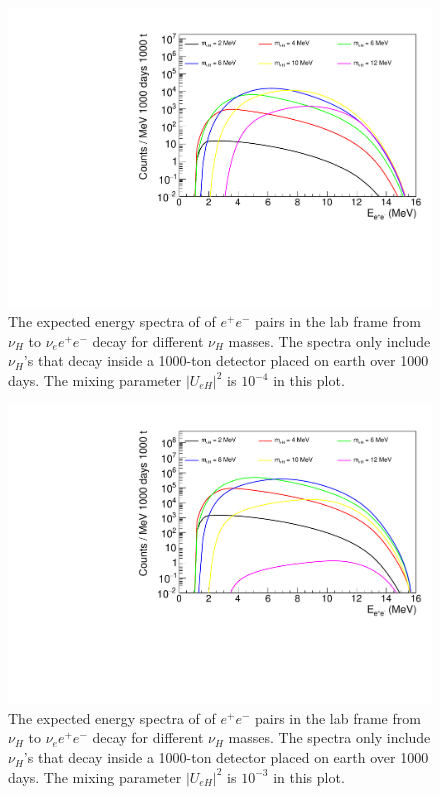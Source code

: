 \documentclass[%
 reprint,
 amsmath,amssymb,
 aps,
 prd,
floatfix,
twocolumn,
]{revtex4-1}
\begin{document}
\begin{figure}[!htbp]
\includegraphics[width=0.99\columnwidth]{../plots/EeeSpectrum_decay_in_detector_integrate_U0.0001_AllMass_linXlogY.pdf}
\caption{The expected energy spectra of of $e^+e^-$ pairs in the lab frame from $\nu_H$ to $\nu_e e^+ e^-$ decay for  different $\nu_H$ masses. 
The spectra only include $\nu_H$'s that decay inside a 1000-ton detector placed on earth over 1000 days. 
The mixing parameter $|U_{eH}|^2$ is  $10^{-4}$ in this plot.}
\label{fig:EeeSpectrum_in_detector_U1em4} 
\end{figure}

\begin{figure}[!htbp]
\includegraphics[width=0.99\columnwidth]{../plots/EeeSpectrum_decay_in_detector_integrate_U0.001_AllMass_linXlogY.pdf}
\caption{The expected energy spectra of of $e^+e^-$ pairs in the lab frame from $\nu_H$ to $\nu_e e^+ e^-$ decay for  different $\nu_H$ masses. 
The spectra only include $\nu_H$'s that decay inside a 1000-ton detector placed on earth over 1000 days. 
The mixing parameter $|U_{eH}|^2$ is  $10^{-3}$ in this plot.}
\label{fig:EeeSpectrum_in_detector_U1em3} 
\end{figure}
\end{document}
